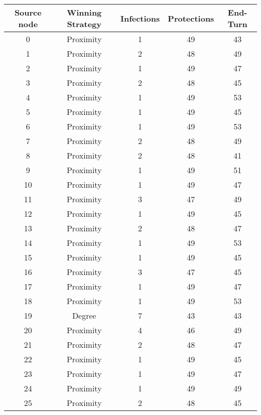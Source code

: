 \documentclass[results.tex]{subfiles}
\begin{document}
\begin{center}
  \begin{tabular}{| c || c | c | c | c |}
    \hline
    {\bfseries Source node} & {\bfseries Winning Strategy} & {\bfseries Infections} & {\bfseries Protections} & {\bfseries End-Turn} \\  %
    \hline\hline
    0 & Proximity & 1 & 49 & 43 \\ 
    \hline
    1 & Proximity & 2 & 48 & 49 \\ 
    \hline
    2 & Proximity & 1 & 49 & 47 \\ 
    \hline
    3 & Proximity & 2 & 48 & 45 \\ 
    \hline
    4 & Proximity & 1 & 49 & 53 \\ 
    \hline
    5 & Proximity & 1 & 49 & 45 \\ 
    \hline
    6 & Proximity & 1 & 49 & 53 \\ 
    \hline
    7 & Proximity & 2 & 48 & 49 \\ 
    \hline
    8 & Proximity & 2 & 48 & 41 \\ 
    \hline
    9 & Proximity & 1 & 49 & 51 \\ 
    \hline
    10 & Proximity & 1 & 49 & 47 \\ 
    \hline
    11 & Proximity & 3 & 47 & 49 \\ 
    \hline
    12 & Proximity & 1 & 49 & 45 \\ 
    \hline
    13 & Proximity & 2 & 48 & 47 \\ 
    \hline
    14 & Proximity & 1 & 49 & 53 \\ 
    \hline
    15 & Proximity & 1 & 49 & 45 \\ 
    \hline
    16 & Proximity & 3 & 47 & 45 \\ 
    \hline
    17 & Proximity & 1 & 49 & 47 \\ 
    \hline
    18 & Proximity & 1 & 49 & 53 \\ 
    \hline
    19 & Degree & 7 & 43 & 43 \\ 
    \hline
    20 & Proximity & 4 & 46 & 49 \\ 
    \hline
    21 & Proximity & 2 & 48 & 47 \\ 
    \hline
    22 & Proximity & 1 & 49 & 45 \\ 
    \hline
    23 & Proximity & 1 & 49 & 47 \\ 
    \hline
    24 & Proximity & 1 & 49 & 49 \\ 
    \hline
    25 & Proximity & 2 & 48 & 45 \\ 

\end{tabular}
\end{center}
\end{document}
